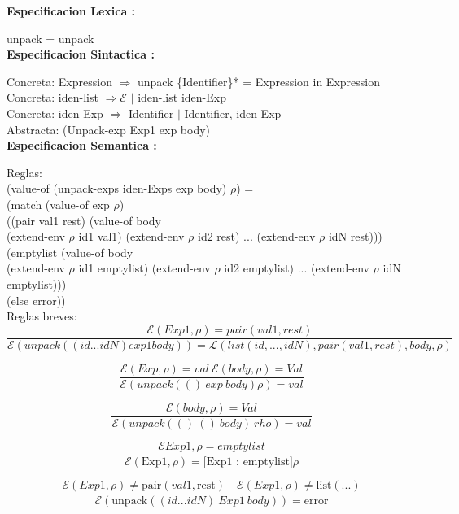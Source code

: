 \documentclass{article}
\begin{document}
\textbf{Especificacion Lexica :} \newline

unpack = unpack \\

\textbf{Especificacion Sintactica :} \newline

Concreta: Expression $\Rightarrow$  unpack \{Identifier\}* = Expression   in Expression \\

Concreta: iden-list $\Rightarrow \mathcal{E}$ $|$ iden-list iden-Exp \\

Concreta: iden-Exp $\Rightarrow$ Identifier $|$ Identifier, iden-Exp \\

Abstracta: (Unpack-exp Exp1 exp body) \\


\textbf{Especificacion Semantica :} \newline

Reglas:\\

(value-of (unpack-exps iden-Exps exp body) $\rho$) = \\
  (match (value-of exp $\rho$) \\
    ((pair val1 rest) (value-of body \\
                        (extend-env $\rho$ id1 val1) (extend-env $\rho$ id2 rest) ... (extend-env $\rho$ idN rest))) \\
    (emptylist (value-of body \\
                        (extend-env $\rho$ id1 emptylist) (extend-env $\rho$ id2 emptylist) ... (extend-env $\rho$ idN emptylist)))\\
    (else error))\\

Reglas breves: \\
$$ 
\frac{\mathcal{E}(Exp1,\rho) = pair(val1,rest)}{\mathcal{E}(unpack((id ... idN) exp1 body)) = \mathcal{L}(list (id,...,idN), pair(val1,rest),body,\rho)}
$$

$$
\frac{\mathcal{E}(Exp,\rho) =val \: \mathcal{E}(body,\rho) =Val}{\mathcal{E}(unpack(() \: exp \: body)\rho) = val}
$$

$$
\frac{\mathcal{E}(body,\rho) =Val}{\mathcal{E}(unpack(() \: () \: body)\    rho) = val}
$$

$$
\frac{\mathcal{E}Exp1,\rho = emptylist}{\mathcal{E}(\text{Exp1}, \rho) = \text{[Exp1 : emptylist]}\rho}
$$

$$
\frac{\mathcal{E}(Exp1,\rho) \neq \text{pair}(val1, \text{rest}) \quad \mathcal{E}(Exp1,\rho) \neq \text{list}(...)}{\mathcal{E}(\text{unpack}((id ... idN) \: Exp1 \: body)) = \text{error}}
$$
\end{document}
